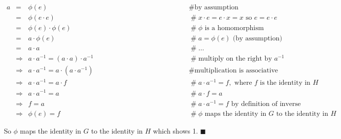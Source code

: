\documentclass{article}
\theoremstyle{definition}
\begin{document}
\begin{equation*}
\begin{array}{rcll}
a 
&=& \phi(e)
                &\hspace{13em} \mathrel{\#}  \text{by assumption} \\
[5pt]
&=& \phi(e \cdot e)
                &\hspace{13em} \mathrel{\#} x \cdot e = e \cdot x = x \text{ so } e = e \cdot e \\
[5pt]
&=& \phi(e) \cdot \phi(e)
                &\hspace{13em} \mathrel{\#} \text{$\phi$ is a homomorphism}\\
[5pt]
&=& a \cdot \phi(e)
                &\hspace{13em} \mathrel{\#} a = \phi(e)  \text{ (by assumption)} \\
[5pt]
&=& a \cdot a
                &\hspace{13em} \mathrel{\#} \hdots \\
[5pt]
&\Rightarrow& a \cdot a^{-1} =  (a \cdot a)  \cdot a^{-1}
                &\hspace{13em} \mathrel{\#} \text{multiply on the right by  $a^{-1}$} \\
[5pt]
&\Rightarrow& a \cdot a^{-1} =  a \cdot (a \cdot a^{-1})
                &\hspace{13em} \mathrel{\#} \text{multiplication is associative} \\
[5pt]
&\Rightarrow& a \cdot a^{-1} =  a \cdot  f
                &\hspace{13em} \mathrel{\#} a \cdot a^{-1} = f, 
                 \text{ where $f$ is the identity in $H$} \\
[5pt]
&\Rightarrow& a \cdot a^{-1} =  a
                &\hspace{13em} \mathrel{\#} a \cdot  f  = a \\
[5pt]
&\Rightarrow& f = a
                &\hspace{13em} \mathrel{\#} a \cdot a^{-1} = f  \text{ by definition of inverse} \\
[5pt]
&\Rightarrow& \phi(e) =  f
                &\hspace{13em} \mathrel{\#} \text{$\phi$ maps the identity in $G$ to the identity in $H$}
\end{array}
\end{equation*}

\bigskip
\noindent
So $\phi$ maps the identity in $G$ to the identity in $H$ which
shows 1. $\blacksquare$
\end{document}
